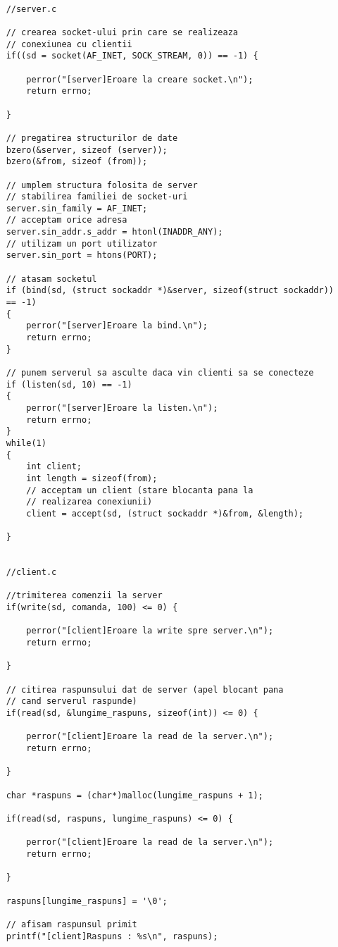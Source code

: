 \documentclass[runningheads]{llncs}
\begin{document}
\begin{verbatim}

    //server.c
    
    // crearea socket-ului prin care se realizeaza 
    // conexiunea cu clientii
    if((sd = socket(AF_INET, SOCK_STREAM, 0)) == -1) {

        perror("[server]Eroare la creare socket.\n");
        return errno;

    }

    // pregatirea structurilor de date 
    bzero(&server, sizeof (server));
    bzero(&from, sizeof (from));

    // umplem structura folosita de server 
    // stabilirea familiei de socket-uri 
    server.sin_family = AF_INET;
    // acceptam orice adresa 
    server.sin_addr.s_addr = htonl(INADDR_ANY);
    // utilizam un port utilizator 
    server.sin_port = htons(PORT);

    // atasam socketul
    if (bind(sd, (struct sockaddr *)&server, sizeof(struct sockaddr)) 
    == -1)
    {
    	perror("[server]Eroare la bind.\n");
    	return errno;
    }  

    // punem serverul sa asculte daca vin clienti sa se conecteze 
    if (listen(sd, 10) == -1)
    {
    	perror("[server]Eroare la listen.\n");
    	return errno;
    }
    while(1)
    {
        int client;
        int length = sizeof(from);
        // acceptam un client (stare blocanta pana la 
        // realizarea conexiunii) 
        client = accept(sd, (struct sockaddr *)&from, &length);
        
    }


    //client.c
    
    //trimiterea comenzii la server 
    if(write(sd, comanda, 100) <= 0) {

        perror("[client]Eroare la write spre server.\n");
        return errno;
        
    }

    // citirea raspunsului dat de server (apel blocant pana 
    // cand serverul raspunde) 
    if(read(sd, &lungime_raspuns, sizeof(int)) <= 0) {
      
        perror("[client]Eroare la read de la server.\n");
        return errno;
        
    }
        
    char *raspuns = (char*)malloc(lungime_raspuns + 1);

    if(read(sd, raspuns, lungime_raspuns) <= 0) {
      
        perror("[client]Eroare la read de la server.\n");
        return errno;
        
    }

    raspuns[lungime_raspuns] = '\0';

    // afisam raspunsul primit 
    printf("[client]Raspuns : %s\n", raspuns);

\end{verbatim}
\end{document}
